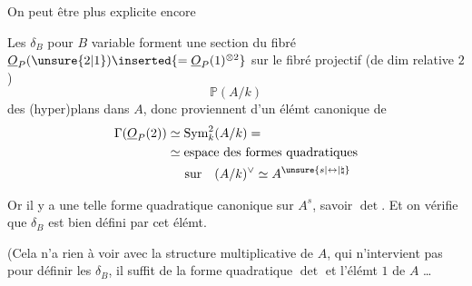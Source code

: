 On peut être plus explicite encore

 Les $\delta_B$ pour $B$ variable forment une section du fibré $\underline{O}_P(\unsure{2|1})\inserted{=\underline{O}_P(1)^{\otimes2}}$ sur le fibré projectif (de dim relative $2$)
\[
\mathbb{P}(A/k)
\]
des (hyper)plans dans $A$, donc proviennent d'un élémt canonique de
\[
\begin{aligned}
\Gamma(\underline{O}_P(2))&\simeq\operatorname{Sym}^2_k(A/k)=\\
&\simeq\text{espace des formes quadratiques}\\
&\hspace{1.4em}\text{sur}\quad(A/k)^\vee\simeq A^{\unsure{s|\leftrightarrow|\natural}}
\end{aligned}
\]

Or il y a une telle forme quadratique canonique sur $A^s$, savoir $\det$. Et on vérifie que $\delta_B$ est bien défini par cet élémt.

(Cela n'a rien à voir avec la structure multiplicative de $A$, qui n'intervient pas pour définir les $\delta_B$, il suffit de la forme quadratique  $\det$ et l'élémt $1$ de $A$  \ldots
